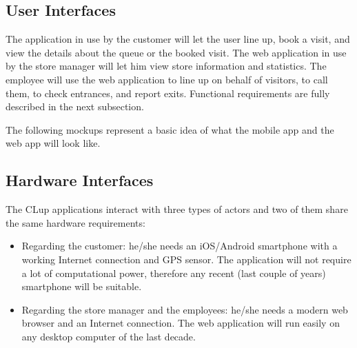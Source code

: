 \subsection{User Interfaces}
The application in use by the customer will let the user line up, book a visit, and view the details about the queue or the booked visit.
The web application in use by the store manager will let him view store information and statistics. The employee will use the web application to line up on behalf of visitors, to call them, to check entrances, and report exits. Functional requirements are fully described in the next subsection. 

The following mockups represent a basic idea of what the mobile app and the web app will look like.

\subsection{Hardware Interfaces}
\label{hardware interfaces}
The CLup applications interact with three types of actors and two of them share the same hardware requirements:
\begin{itemize}
    \item Regarding the customer: he/she needs an iOS/Android smartphone with a working Internet connection and GPS sensor. The application will not require a lot of computational power, therefore any recent (last couple of years) smartphone will be suitable.
    \item Regarding the store manager and the employees: he/she needs a modern web browser and an Internet connection. The web application will run easily on any desktop computer of the last decade.
\end{itemize}
